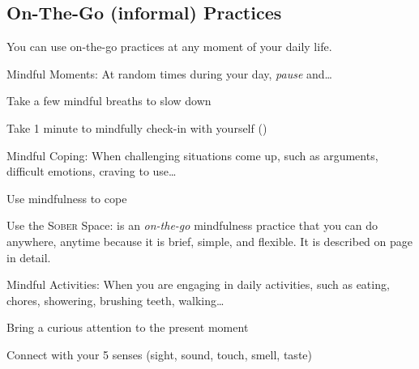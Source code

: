 \subsection{On-The-Go (informal) Practices}
	You can use on-the-go practices at any moment of your daily life.
	\begin{description*}
		\item[Mindful Moments:] At random times during your day, \emph{pause} and…
			\begin{itemize*}
				\item Take a few mindful breaths to slow down 
				\item Take 1 minute to mindfully check-in with yourself ()
			\end{itemize*}
		\item[Mindful Coping:] When challenging situations come up, such as arguments, difficult emotions, craving to use…
			\begin{itemize*}
				\item Use mindfulness to cope
				\item Use the \textsc{Sober} Space: is an \emph{on-the-go} mindfulness practice that you can do anywhere, anytime because it is brief, simple, and flexible. It is described on page \pageref{sober-space} in detail.
			\end{itemize*}
		\item[Mindful Activities:] When you are engaging in daily activities, such as eating, chores, showering, brushing teeth, walking…
			\begin{itemize*}
				\item Bring a curious attention to the present moment
				\item Connect with your 5 senses (sight, sound, touch, smell, taste)
			\end{itemize*}
	\end{description*}

\clearpage
